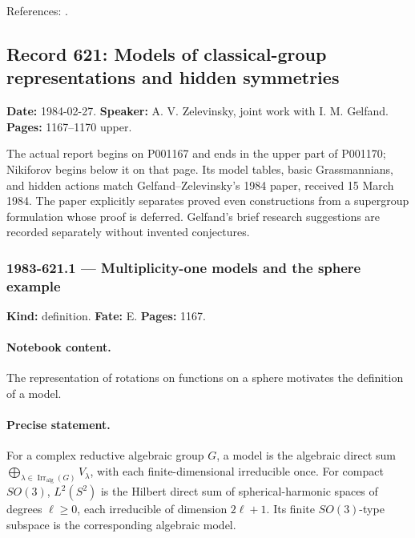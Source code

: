 \noindent References: \citep{cherednik1985finite}.\par

\subsection{Record 621: Models of classical-group representations and hidden symmetries}

\label{talk:621}

\noindent\textbf{Date:} 1984-02-27. \textbf{Speaker:} A. V. Zelevinsky, joint work with I. M. Gelfand. \textbf{Pages:} 1167--1170 upper.\par

The actual report begins on P001167 and ends in the upper part of P001170; Nikiforov begins below it on that page. Its model tables, basic Grassmannians, and hidden actions match Gelfand–Zelevinsky’s 1984 paper, received 15 March 1984. The paper explicitly separates proved even constructions from a supergroup formulation whose proof is deferred. Gelfand’s brief research suggestions are recorded separately without invented conjectures.

\subsubsection{1983-621.1 --- Multiplicity-one models and the sphere example}

\label{item:1983-621.1}

\noindent\textbf{Kind:} definition. \textbf{Fate:} E. \textbf{Pages:} 1167.\par

\paragraph{Notebook content.} The representation of rotations on functions on a sphere motivates the definition of a model.

\paragraph{Precise statement.} For a complex reductive algebraic group \(G\), a model is the algebraic direct sum \(\bigoplus_{\lambda\in\operatorname{Irr}_{\mathrm{alg}}(G)}V_\lambda\), with each finite-dimensional irreducible once. For compact \(SO(3)\), \(L^2(S^2)\) is the Hilbert direct sum of spherical-harmonic spaces of degrees \(\ell\ge0\), each irreducible of dimension \(2\ell+1\). Its finite \(SO(3)\)-type subspace is the corresponding algebraic model.

